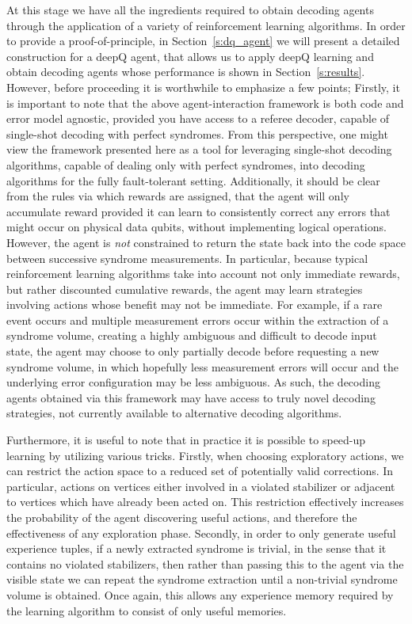\documentclass[twocolumn,preprintnumbers,amsmath,amssymb,notitlepage,nofootinbib,longbibliography,superscriptaddress,aps,pra,10pt]{revtex4-1}
\begin{document}
	At this stage we have all the ingredients required to obtain decoding agents through the application of a variety of reinforcement learning algorithms.
	In order to provide a proof-of-principle, in Section~\ref{s:dq_agent} we will present a detailed construction for a deepQ agent, that allows us to apply deepQ learning and obtain decoding agents whose
	performance is shown in Section~\ref{s:results}.
	However, before proceeding it is worthwhile to emphasize a few points;
	Firstly, it is important to note that the above agent-interaction framework is both code and error model agnostic, provided you have access to a referee decoder, capable of single-shot decoding with perfect syndromes.
	From this perspective, one might view the framework presented here as a tool for leveraging single-shot decoding algorithms, capable of dealing only with perfect syndromes, into decoding algorithms for the fully fault-tolerant setting.
	Additionally, it should be clear from the rules via which rewards are assigned, that the agent will only accumulate reward provided it can learn to consistently correct any errors that might occur on physical data qubits, without implementing logical operations.
	However, the agent is \textit{not} constrained to return the state back into the code space between successive syndrome measurements.
	In particular, because typical reinforcement learning algorithms take into account not only immediate rewards, but rather discounted cumulative rewards, the agent may learn strategies involving actions whose benefit may not be immediate.
	For example, if a rare event occurs and multiple measurement errors occur within the extraction of a syndrome volume, creating a highly ambiguous and difficult to decode input state, the agent may choose to only partially decode before requesting a new syndrome volume, in which hopefully less measurement errors will occur and the underlying error configuration may be less ambiguous.
	As such, the decoding agents obtained via this framework may have access to truly novel decoding strategies, not currently available to alternative decoding algorithms.

	Furthermore, it is useful to note that in practice it is possible to speed-up learning by utilizing various tricks.
	Firstly, when choosing exploratory actions, we can restrict the action space to a reduced set of potentially valid corrections.
	In particular, actions on vertices either involved in a violated stabilizer or adjacent to vertices which have already been acted on.
	This restriction effectively increases the probability of the agent discovering useful actions, and therefore the effectiveness of any exploration phase.
	Secondly, in order to only generate useful experience tuples, if a newly extracted syndrome is trivial, in the sense that it contains no violated stabilizers, then rather than passing this to the agent via the visible state we can repeat the syndrome extraction until a non-trivial syndrome volume is obtained.
	Once again, this allows any experience memory required by the learning algorithm to consist of only useful memories.
\end{document}
